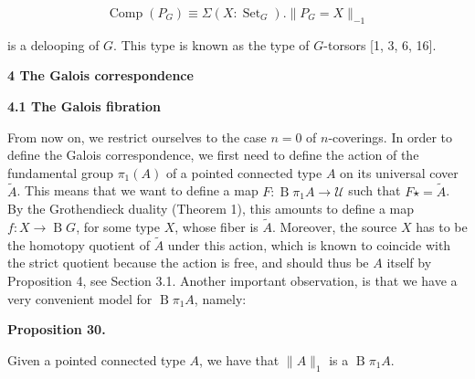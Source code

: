 \par  \quad  \[\operatorname{Comp}(P_{G})\equiv\Sigma(X:\operatorname{Set}_{G}).\|P_{G}=X\|_{-1}\]\quad  \quad  
  
is a delooping of $G$. This type is known as the type of $G$-torsors [1, 3, 6, 16].\par
 
 
 
 
 


 
\par\medskip\noindent\textbf{4 The Galois correspondence}\par
 
 
\par\medskip\noindent\textbf{4.1 The Galois fibration}\par
 
 
From now on, we restrict ourselves to the case $n=0$ of $n$-coverings. In order to define the Galois correspondence, we first need to define the action of the fundamental group $\pi_{1}(A)$ of a pointed connected type $A$ on its universal cover $\tilde{A}$. This means that we want to define a map $F:\operatorname{B}\pi_{1}A\to\mathcal{U}$ such that $F\star=\tilde{A}$. By the Grothendieck duality (Theorem 1), this amounts to define a map $f:X\to\operatorname{B}G$, for some type $X$, whose fiber is $\tilde{A}$. Moreover, the source $X$ has to be the homotopy quotient of $\tilde{A}$ under this action, which is known to coincide with the strict quotient because the action is free, and should thus be $A$ itself by Proposition 4, see Section 3.1. Another important observation, is that we have a very convenient model for $\operatorname{B}\pi_{1}A$, namely:\par
 
 
 
\par\medskip\noindent\textbf{Proposition 30.}\par
 
 
Given a pointed connected type $A$, we have that $\|A\|_{1}$ is a $\operatorname{B}\pi_{1}A$.\par
 
